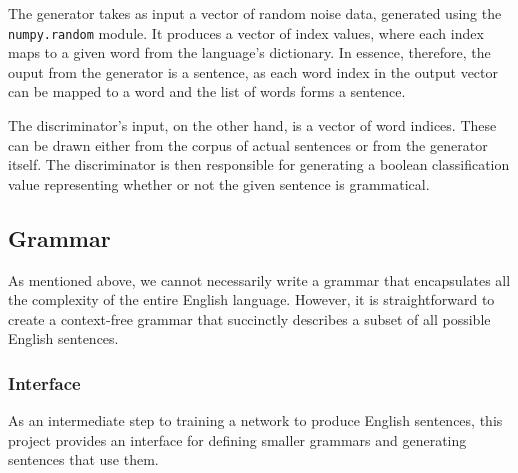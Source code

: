 \documentclass[12pt]{article}
\begin{document}
The generator takes as input a vector of random noise data, generated using the \texttt{numpy.random} module. It produces a vector of index values, where each index maps to a given word from the language's dictionary. In essence, therefore, the ouput from the generator is a sentence, as each word index in the output vector can be mapped to a word and the list of words forms a sentence.

The discriminator's input, on the other hand, is a vector of word indices. These can be drawn either from the corpus of actual sentences or from the generator itself. The discriminator is then responsible for generating a boolean classification value representing whether or not the given sentence is grammatical.

\subsection{Grammar}

As mentioned above, we cannot necessarily write a grammar that encapsulates all the complexity of the entire English language. However, it is straightforward to create a context-free grammar that succinctly describes a subset of all possible English sentences.

\subsubsection{Interface}

As an intermediate step to training a network to produce English sentences, this project provides an interface for defining smaller grammars and generating sentences that use them.
\end{document}
